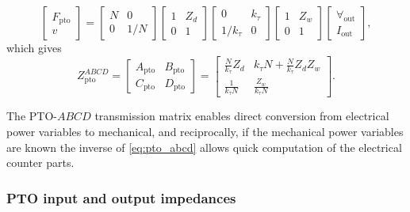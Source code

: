 \documentclass[lettersize,journal]{IEEEtran}
\begin{document}
 \begin{equation}
 	\label{eq:Z_cascade_to_ABCD}
 	\begin{bmatrix} 
 		F_{\textrm{pto}} \\
 		v 
 	\end{bmatrix} 
 	\! = \!
 	\begin{bmatrix} 
 		N & 0 \\ 
 		0 & 1/N 
 	\end{bmatrix} \!\!\!
  	\begin{bmatrix} 
	 	1 & Z_d \\ 
 		0 & 1 
	 \end{bmatrix}  \!\!\!
   	\begin{bmatrix} 
	 	0 & k_{\tau} \\ 
	 	1/k_{\tau} & 0 
	 \end{bmatrix} \!\!\!
   	\begin{bmatrix} 
	 	1 & Z_w \\ 
	 	0 & 1 
	 \end{bmatrix} \!
 	\begin{bmatrix} 
 		\forall_{\textrm{out}} \\
 		I_{\textrm{out}} 
 	\end{bmatrix} \!, 
 \end{equation}
 which gives
  \begin{equation}
 	Z_{\textrm{pto}}^{ABCD} 
 	= 
 	\begin{bmatrix} 
 		A_{\textrm{pto}} & B_{\textrm{pto}} \\ 
 		C_{\textrm{pto}} & D_{\textrm{pto}} 
 	\end{bmatrix}
 	=
 	\begin{bmatrix} 
 		\frac{N}{k_{\tau}}  Z_d			& k_\tau N +\frac{N}{k_{\tau}}  Z_dZ_w  \\
 		\frac{1}{k_{\tau}N}           	& \frac{Z_w}{k_{\tau}N} 
 	\end{bmatrix}.
 	\label{eq:pto_abcd}
 \end{equation}

\noindent{}The PTO-$ABCD$ transmission matrix enables direct conversion from electrical power variables to mechanical, and reciprocally, if the mechanical power variables are known the inverse of \eqref{eq:pto_abcd} allows quick computation of the electrical counter parts.
\subsubsection{PTO input and output impedances}\label{sec:pto_input_and_output_impedances}
\end{document}
